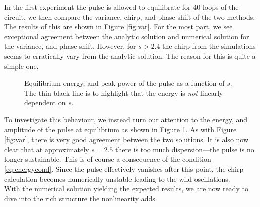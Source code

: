 In the first experiment the pulse is allowed to equilibrate for 40 loops of the circuit, we then compare the variance, chirp, and phase shift of the two methods. The results of this are shown in Figure \ref{fig:var}. For the most part, we see exceptional agreement between the analytic solution and numerical solution for the variance, and phase shift. However, for $s > 2.4$ the chirp from the simulations seems to erratically vary from the analytic solution. The reason for this is quite a simple one. \\
\begin{figure}[tbp]
\centering

\caption[Equilibrium energy, and peak power of the pulse as a function of $s$.]{Equilibrium energy, and peak power of the pulse as a function of $s$. The thin black line is to highlight that the energy is \emph{not} linearly dependent on $s$.}
\label{fig:valenergy}
\end{figure}

To investigate this behaviour, we instead turn our attention to the energy, and amplitude of the pulse at equilibrium as shown in Figure \ref{fig:valenergy}. As with Figure \ref{fig:var}, there is very good agreement between the two solutions. It is also now clear that at approximately $s = 2.5$ there is too much dispersion---the pulse is no longer sustainable. This is of course a consequence of the condition \eqref{eq:energycond}. Since the pulse effectively vanishes after this point, the chirp calculation becomes numerically unstable leading to the wild oscillations. \\

With the numerical solution yielding the expected results, we are now ready to dive into the rich structure the nonlinearity adds.


